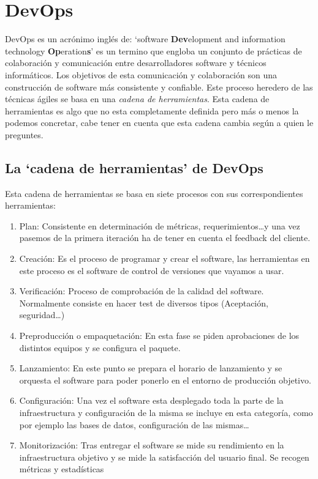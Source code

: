 \section{DevOps}

DevOps es un acrónimo inglés de: `software \textbf{Dev}elopment and information technology \textbf{Op}eration\textbf{s}' es un termino que engloba un conjunto de prácticas de colaboración y comunicación entre desarrolladores software y técnicos informáticos. Los objetivos de esta comunicación y colaboración son una construcción de software más consistente y confiable. Este proceso heredero de las técnicas ágiles se basa en una \textit{cadena de herramientas}. Esta cadena de herramientas es algo que no esta completamente definida pero más o menos la podemos concretar, cabe tener en cuenta que esta cadena cambia según a quien le preguntes.

\subsection{La `cadena de herramientas' de DevOps}

Esta cadena de herramientas se basa en siete procesos con sus correspondientes herramientas:

\begin{enumerate}
 \item Plan: Consistente en determinación de métricas, requerimientos\ldots y una vez pasemos de la primera iteración ha de tener en cuenta el feedback del cliente.
 \item Creación: Es el proceso de programar y crear el software, las herramientas en este proceso es el software de control de versiones que vayamos a usar.
 \item Verificación: Proceso de comprobación de la calidad del software. Normalmente consiste en hacer test de diversos tipos (Aceptación, seguridad\ldots)
 \item Preproducción o empaquetación: En esta fase se piden aprobaciones de los distintos equipos y se configura el paquete.
 \item Lanzamiento: En este punto se prepara el horario de lanzamiento y se orquesta el software para poder ponerlo en el entorno de producción objetivo.
 \item Configuración: Una vez el software esta desplegado toda la parte de la infraestructura y configuración de la misma se incluye en esta categoría, como por ejemplo las bases de datos, configuración de las mismas\ldots 
 \item Monitorización: Tras entregar el software se mide su rendimiento en la infraestructura objetivo y se mide la satisfacción del usuario final. Se recogen métricas y estadísticas
\end{enumerate}


